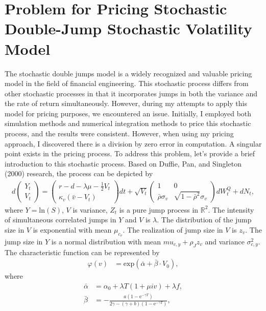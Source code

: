 \section{Problem for Pricing Stochastic Double-Jump Stochastic Volatility Model}
The stochastic double jumps model is a widely recognized and valuable pricing model in the field of financial engineering. This stochastic process differs from other stochastic processes in that it incorporates jumps in both the variance and the rate of return simultaneously. However, during my attempts to apply this model for pricing purposes, we encountered an issue. Initially, I employed both simulation methods and numerical integration methods to price this stochastic process, and the results were consistent. However, when using my pricing approach, I discovered there is a division by zero error in computation. A singular point exists in the pricing process. To address this problem, let's provide a brief introduction to this stochastic process. Based on Duffie, Pan, and Singleton (2000) research, the process can be depicted by
\begin{align*}
d\left(\begin{array}{c}
Y_t \\
V_t
\end{array}\right)=\left(\begin{array}{c}
r-d-\lambda \mu-\frac{1}{2} V_t \\
\kappa_v\left(\bar{v}-V_t\right)
\end{array}\right) d t+\sqrt{V_t}\left(\begin{array}{cc}
1 & 0 \\
\bar{\rho} \sigma_v & \sqrt{1-\bar{\rho}^2} \sigma_v
\end{array}\right) d W_t^Q+d N_t,
\end{align*}
where $Y = \mathrm{ln}\left(S\right)$, $V$ is variance, $Z_t$ is a pure jump process in $\mathbb{R}^2$. The intensity of simultaneous correlated jumps in $Y$ and $V$ is $\lambda$. The distribution of the jump size in $V$ is exponential with mean $\mu_{c_v}$. The realization of jump size in $V$ is $z_v$. The jump size in $Y$ is a normal distribution with mean $mu_{c,y} + \rho_J z_v$ and variance $\sigma_{c,y}^2$. The characteristic function can be represented by
\begin{align*}
\varphi(v) & =\mathrm{exp}(\bar{\alpha} + \bar{\beta} \cdot V_0),
\end{align*}
where
\begin{align*}
\bar{\alpha} &= \alpha_0 + \lambda T \left(1 + \mu iv \right) + \lambda f, \\
\bar{\beta} &= -\frac{a\left(1 - \mathrm{e}^{-\gamma T}\right)}{2\gamma - \left(\gamma + b\right)\left(1 - \mathrm{e}^{-\gamma T}\right)},\\
\end{align*}
